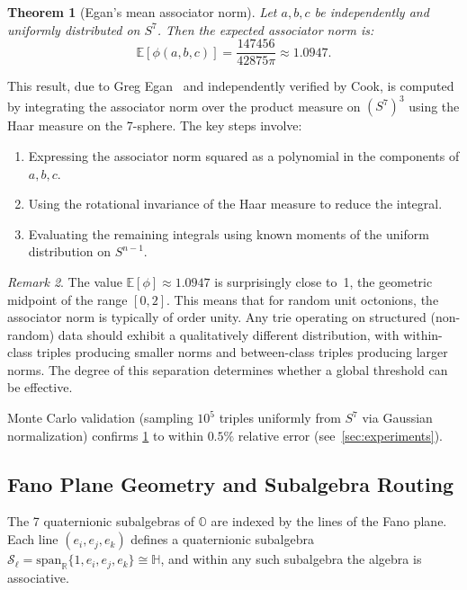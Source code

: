 \documentclass[11pt,a4paper]{article}
\newtheorem{theorem}{Theorem}[section]
\theoremstyle{definition}
\theoremstyle{remark}
\newtheorem{remark}[theorem]{Remark}
\newcommand{\Oct}{\mathbb{O}}
\newcommand{\Real}{\mathbb{R}}
\newcommand{\Quat}{\mathbb{H}}
\begin{document}
\begin{theorem}[Egan's mean associator norm]
\label{thm:egan}
Let $a, b, c$ be independently and uniformly distributed on $S^7$. Then the expected associator norm is:
\begin{equation}
  \mathbb{E}[\phi(a, b, c)] = \frac{147456}{42875\pi} \approx 1.0947.
  \label{eq:egan-mean}
\end{equation}
\end{theorem}

This result, due to Greg Egan~\citep{Egan2024} and independently verified by Cook, is computed by integrating the associator norm over the product measure on $(S^7)^3$ using the Haar measure on the 7-sphere. The key steps involve:
\begin{enumerate}[nosep]
  \item Expressing the associator norm squared as a polynomial in the components of $a, b, c$.
  \item Using the rotational invariance of the Haar measure to reduce the integral.
  \item Evaluating the remaining integrals using known moments of the uniform distribution on $S^{n-1}$.
\end{enumerate}

\begin{remark}
The value $\mathbb{E}[\phi] \approx 1.0947$ is surprisingly close to~1, the geometric midpoint of the range $[0, 2]$. This means that for random unit octonions, the associator norm is typically of order unity. Any trie operating on structured (non-random) data should exhibit a qualitatively different distribution, with within-class triples producing smaller norms and between-class triples producing larger norms. The degree of this separation determines whether a global threshold can be effective.
\end{remark}

Monte Carlo validation (sampling $10^5$ triples uniformly from $S^7$ via Gaussian normalization) confirms \cref{thm:egan} to within $0.5\%$ relative error (see~\cref{sec:experiments}).

\subsection{Fano Plane Geometry and Subalgebra Routing}
\label{sec:fano-geometry}

The 7 quaternionic subalgebras of $\Oct$ are indexed by the lines of the Fano plane. Each line $(e_i, e_j, e_k)$ defines a quaternionic subalgebra $\mathcal{S}_\ell = \text{span}_\Real\{1, e_i, e_j, e_k\} \cong \Quat$, and within any such subalgebra the algebra is associative.
\end{document}
